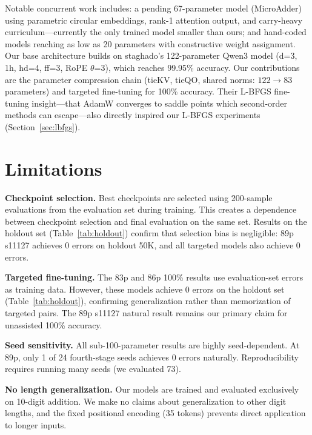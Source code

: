 \documentclass[11pt]{article}
\begin{document}
Notable concurrent work includes: a pending 67-parameter model
(MicroAdder) using parametric circular embeddings, rank-1 attention
output, and carry-heavy curriculum---currently the only trained model
smaller than ours; and hand-coded models reaching as low as 20 parameters
with constructive weight assignment.
Our base architecture builds on staghado's 122-parameter Qwen3 model
(d=3, 1h, hd=4, ff=3, RoPE $\theta$=3), which reaches 99.95\% accuracy.
Our contributions are the parameter compression chain
(tieKV, tieQO, shared norms: $122 \to 83$ parameters) and targeted
fine-tuning for 100\% accuracy. Their L-BFGS fine-tuning insight---that
AdamW converges to saddle points which second-order methods can
escape---also directly inspired our L-BFGS experiments
(Section~\ref{sec:lbfgs}).

\section{Limitations}
\label{sec:limitations}

\textbf{Checkpoint selection.} Best checkpoints are selected using
200-sample evaluations from the evaluation set during training. This
creates a dependence between checkpoint selection and final evaluation
on the same set. Results on the holdout set
(Table~\ref{tab:holdout}) confirm that selection bias is negligible:
89p s11127 achieves 0 errors on holdout 50K, and all targeted models
also achieve 0 errors.

\textbf{Targeted fine-tuning.} The 83p and 86p 100\% results use
evaluation-set errors as training data. However, these models achieve
0 errors on the holdout set (Table~\ref{tab:holdout}), confirming
generalization rather than memorization of targeted pairs. The
89p s11127 natural result remains our primary claim for unassisted
100\% accuracy.

\textbf{Seed sensitivity.} All sub-100-parameter results are highly
seed-dependent. At 89p, only 1 of 24 fourth-stage seeds achieves 0
errors naturally. Reproducibility requires running many seeds (we
evaluated 73).

\textbf{No length generalization.} Our models are trained and evaluated
exclusively on 10-digit addition. We make no claims about generalization
to other digit lengths, and the fixed positional encoding (35 tokens)
prevents direct application to longer inputs.
\end{document}
